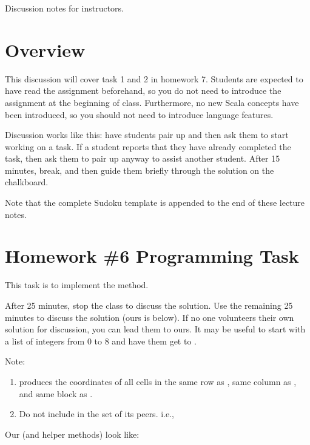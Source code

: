 
Discussion notes for instructors.

\section{Overview}

This discussion will cover task 1 and 2 in homework 7.  Students are expected to have read the assignment beforehand, so you do not need to introduce the assignment at the beginning of class.  Furthermore, no new Scala concepts have been introduced, so you should not need to introduce language features.

Discussion works like this: have students pair up and then ask them to start working on a task.  If a student reports that they have already completed the task, then ask them to pair up anyway to assist another student.  After 15 minutes, break, and then guide them briefly through the solution on the chalkboard.

Note that the complete Sudoku template is appended to the end of these lecture notes.

\section{Homework \#6 Programming Task}

This task is to implement the  method.

After 25 minutes, stop the class to discuss the solution. Use the remaining 25 minutes to
discuss the solution (ours is below). If no one volunteers their own solution for discussion,
you can lead them to ours. It may be useful to start with a list of integers from 0 to 8 and 
have them get to .

Note: 

\begin{enumerate}
  \item {} produces the coordinates of all cells in the same
    row as , same column as , and same block as 
    . 
  \item Do not include  in the set of its peers. i.e., 
\end{enumerate}

Our  (and helper methods) look like:

